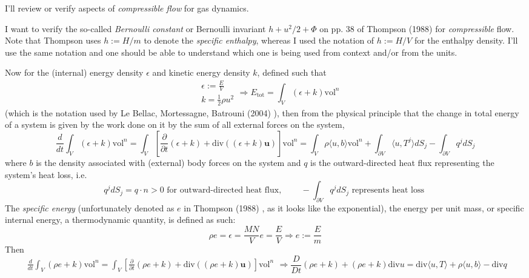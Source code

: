 \documentclass[10pt]{amsart}
\begin{document}
\begin{multicols*}{2}
I'll review or verify aspects of \emph{compressible flow} for gas dynamics.  

I want to verify the so-called \emph{Bernoulli constant} or Bernoulli invariant $h+u^2/2 + \Phi$ on pp. 38 of Thompson (1988) \cite{PThompson1988} for \emph{compressible} flow.  Note that Thompson uses $h:= H/m$ to denote the \emph{specific enthalpy}, whereas I used the notation of $h:=H/V$ for the enthalpy density.  I'll use the same notation and one should be able to understand which one is being used from context and/or from the units.  

Now for the (internal) energy density $\epsilon$ and kinetic energy density $k$, defined such that 
\[
\begin{aligned}
  & \epsilon := \frac{E}{V} \\ 
  & k = \frac{1}{2} \rho u^2
\end{aligned} \Longrightarrow E_{\text{tot}} = \int_V (\epsilon +k) \text{vol}^n
\]
(which is the notation used by Le Bellac, Mortessagne, Batrouni (2004) \cite{MLeBellacFMortessagneGBatrouni2004}), then from the physical principle that the change in total energy of a system is given by the work done on it by the sum of all external forces on the system,
\[
\frac{d}{dt} \int_V (\epsilon + k) \text{vol}^n = \int_V \left[ \frac{ \partial }{ \partial t}( \epsilon + k) + \text{div}((\epsilon +k)\mathbf{u} ) \right] \text{vol}^n = \int_V \rho \langle u,b\rangle \text{vol}^n + \int_{\partial V} \langle u , T^j \rangle dS_j - \int_{\partial V} q^j dS_j
\]
where $b$ is the density associated with (external) body forces on the system and $q$ is the outward-directed heat flux representing the system's heat loss, i.e.
\[
q^j dS_j = q\cdot n > 0 \text{ for outward-directed heat flux, } \qquad -\int_{\partial V} q^j dS_j \text{ represents heat loss }
\]
The \emph{specific energy} (unfortunately denoted as $e$ in Thompson (1988) \cite{PThompson1988}, as it looks like the exponential), the energy per unit mass, or specific internal energy, a thermodynamic quantity, is defined as such:
\[
\rho e = \epsilon = \frac{MN}{V} e = \frac{E}{V} \Longrightarrow e:= \frac{E}{m}
\]
Then
\[
\begin{gathered}
  \frac{d}{dt} \int_V (\rho e + k ) \text{vol}^n = \int_V \left[ \frac{ \partial }{ \partial t} (\rho e + k) + \text{div}((\rho e + k)\mathbf{u}) \right] \text{vol}^n
\end{gathered} \Longrightarrow \frac{D}{Dt}(\rho e + k) + (\rho e+k) \text{div}u = \text{div}\langle u, T \rangle + \rho \langle u, b\rangle - \text{div} q
\]
\end{multicols*}
\end{document}
